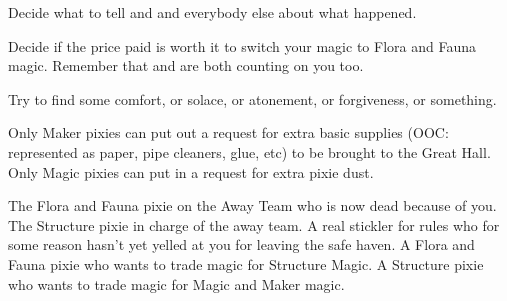 \documentclass[char]{PP}
\begin{document}
\begin{itemz}
	\item Decide what to tell \cSPM{} and \cELove{} and everybody else about what happened.
	\item Decide if the price paid is worth it to switch your magic to Flora and Fauna magic. Remember that \cFWanabe{} and \cSAdvisor{} are both counting on you too.
	\item Try to find some comfort, or solace, or atonement, or forgiveness, or something.
\end{itemz}

\begin{itemz}[Notes]
	\item Only Maker pixies can put out a request for extra basic supplies (OOC: represented as paper, pipe cleaners, glue, etc) to be brought to the Great Hall. Only Magic pixies can put in a request for extra pixie dust.
\end{itemz}

\begin{contacts}
	\contact{\cFLost{}} The Flora and Fauna pixie on the Away Team who is now dead because of you.
	\contact{\cSPM{}} The Structure pixie in charge of the away team. A real stickler for rules who for some reason hasn’t yet yelled at you for leaving the safe haven.
	\contact{\cFWanabe{}} A Flora and Fauna pixie who wants to trade \cFWanabe{\their} magic for Structure Magic.
	\contact{\cSAdvisor{}} A Structure pixie who wants to trade \cSAdvisor{\their} magic for Magic and Maker magic.
\end{contacts}
\end{document}
